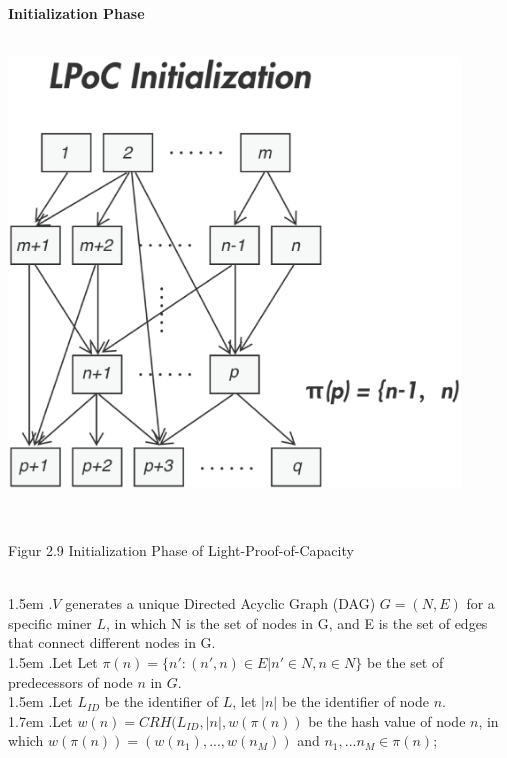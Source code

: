 \documentclass[10pt,a4paper]{article}
\begin{document}
\noindent   
 {\bf Initialization Phase }\\\\
\centerline{\includegraphics[width=340pt]{fig9}}
 \\ \centerline{{Figur 2.9 Initialization Phase of Light-Proof-of-Capacity}}
 \vspace{-1.5em}
\\

\hangindent 1.5em
.\quad $V$ generates a unique Directed Acyclic Graph (DAG) $G=(N, E)$ for a specific miner $L$, in which N is the set of nodes in G, and E is the set of edges that connect different nodes in G.
\vspace{-0.8em}
\\

\hangindent 1.5em
.\quad Let Let $\pi(n)=\{n':(n',n)\in E|n'\in N, n\in N\}$ be the set of predecessors of node $n$ in $G$.
\vspace{-0.8em}
\\

\hangindent 1.5em
.\quad Let $L_{ID}$ be the identifier of $L$, let $|n|$ be the identifier of node $n$.
\vspace{-0.8em}
\\

\hangindent 1.7em
.\quad Let $w(n)=CRH(L_{ID}, |n|, w(\pi(n))$ be the hash value of node $n$, in which $w(\pi(n))=(w(n_{1}),...,w(n_{M}))$ and $n_{1},...n_{M} \in \pi(n)$;
\vspace{-0.8em}
\\
\end{document}
